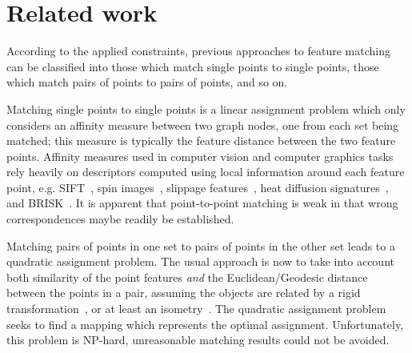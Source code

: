 \section{Related work}
\label{sec:related}

According to the applied constraints,
previous approaches to feature matching can be classified into those which match single points to single points, those which match pairs of points to pairs of points, and so on.

Matching single points to single points is a linear assignment problem which only considers an affinity measure between two graph nodes, one from each set being matched;
this measure is typically the feature distance between the two feature points.
Affinity measures used in computer vision and computer graphics tasks rely heavily on descriptors computed using local information around each feature point,
e.g. SIFT~\cite{Lowe04}, spin images~\cite{Johnson99}, slippage features~\cite{Bokeloh08}, heat diffusion signatures~\cite{Sun09}, and BRISK~\cite{Leutenegger11}.
It is apparent that point-to-point matching is weak in that wrong correspondences maybe readily be established.

Matching pairs of points in one set to pairs of points in the other set leads to a quadratic assignment problem.
The usual approach is now to take into account both similarity of the point features \emph{and} the Euclidean/Geodesic distance between the points in a pair,
assuming the objects are related by a rigid transformation~\cite{Leordeanu05,Cour06}, or at least an isometry~\cite{li08,Tevs09,Ovsjanikov10,Tevs11,SahilliogluY11,Windheuser11}.
The quadratic assignment problem seeks to find a mapping which represents the optimal assignment.
Unfortunately, this problem is NP-hard, unreasonable matching results could not be avoided.

